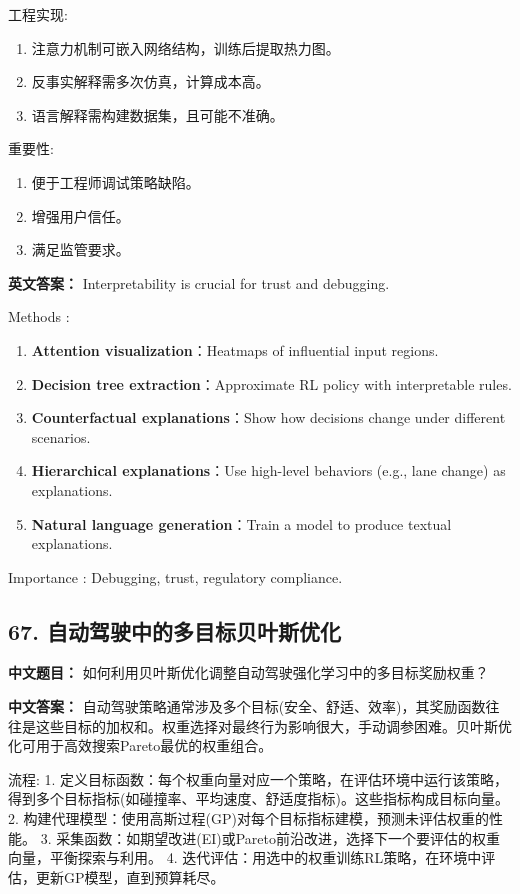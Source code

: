 \documentclass[10pt,a4paper]{ctexart}
\begin{document}
 工程实现:
\begin{enumerate}
    \item 注意力机制可嵌入网络结构，训练后提取热力图。
    \item 反事实解释需多次仿真，计算成本高。
    \item 语言解释需构建数据集，且可能不准确。
\end{enumerate}

 重要性:
\begin{enumerate}
    \item 便于工程师调试策略缺陷。
    \item 增强用户信任。
    \item 满足监管要求。
\end{enumerate}

\textbf{英文答案：}  
Interpretability is crucial for trust and debugging.

 Methods :
\begin{enumerate}
    \item \textbf{Attention visualization}：Heatmaps of influential input regions.
    \item \textbf{Decision tree extraction}：Approximate RL policy with interpretable rules.
    \item \textbf{Counterfactual explanations}：Show how decisions change under different scenarios.
    \item \textbf{Hierarchical explanations}：Use high-level behaviors (e.g., lane change) as explanations.
    \item \textbf{Natural language generation}：Train a model to produce textual explanations.
\end{enumerate}

 Importance : Debugging, trust, regulatory compliance.

\subsection*{67. 自动驾驶中的多目标贝叶斯优化}
\textbf{中文题目：} 如何利用贝叶斯优化调整自动驾驶强化学习中的多目标奖励权重？

\textbf{中文答案：}  
自动驾驶策略通常涉及多个目标(安全、舒适、效率)，其奖励函数往往是这些目标的加权和。权重选择对最终行为影响很大，手动调参困难。贝叶斯优化可用于高效搜索Pareto最优的权重组合。

 流程:
1. 定义目标函数：每个权重向量对应一个策略，在评估环境中运行该策略，得到多个目标指标(如碰撞率、平均速度、舒适度指标)。这些指标构成目标向量。
2. 构建代理模型：使用高斯过程(GP)对每个目标指标建模，预测未评估权重的性能。
3. 采集函数：如期望改进(EI)或Pareto前沿改进，选择下一个要评估的权重向量，平衡探索与利用。
4. 迭代评估：用选中的权重训练RL策略，在环境中评估，更新GP模型，直到预算耗尽。
\end{document}
